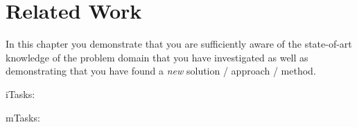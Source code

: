 \chapter{Related Work}\label{relatedwork}
In this chapter you demonstrate that you are sufficiently aware of the
state-of-art knowledge of the problem domain that you have investigated as
well as demonstrating that you have found a \emph{new} solution / approach / method.

iTasks: \cite{plasmeijer2007itasks}

mTasks: \cite{koopman2018task, lubbers2019multitasking}
